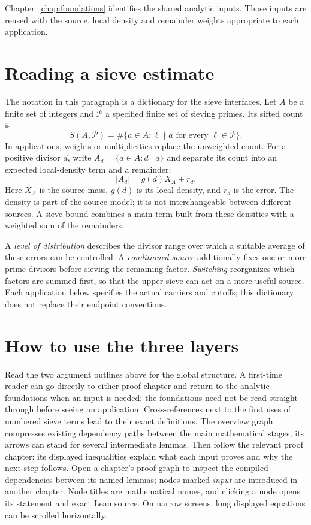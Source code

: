 Chapter~\ref{chap:foundations} identifies the shared analytic inputs.
Those inputs are reused with the source, local density and remainder
weights appropriate to each application.

\section{Reading a sieve estimate}

The notation in this paragraph is a dictionary for the sieve interfaces.
Let $A$ be a finite set of integers and $\mathcal P$ a specified finite set
of sieving primes. Its sifted count is
\[
 S(A,\mathcal P)=\#\{a\in A:\ell\nmid a\text{ for every }\ell\in\mathcal P\}.
\]
In applications, weights or multiplicities replace the unweighted count.
For a positive divisor $d$, write $A_d=\{a\in A:d\mid a\}$ and separate
its count into an expected local-density term and a remainder:
\[
 |A_d|=g(d)X_A+r_d.
\]
Here $X_A$ is the source mass, $g(d)$ is its local density, and $r_d$ is the
error. The density is part of the source model; it is not interchangeable
between different sources. A sieve bound combines a main term built from
these densities with a weighted sum of the remainders.

A \emph{level of distribution} describes the divisor range over which a
suitable average of these errors can be controlled. A \emph{conditioned
source} additionally fixes one or more prime divisors before sieving the
remaining factor. \emph{Switching} reorganizes which factors are summed
first, so that the upper sieve can act on a more useful source. Each
application below specifies the actual carriers and cutoffs; this dictionary
does not replace their endpoint conventions.

\section{How to use the three layers}

Read the two argument outlines above for the global structure. A first-time
reader can go directly to either proof chapter and return to the analytic
foundations when an input is needed; the foundations need not be read straight
through before seeing an application. Cross-references next to the first uses
of numbered sieve terms lead to their exact definitions. The overview
graph compresses existing dependency paths between the main mathematical
stages; its arrows can stand for several intermediate lemmas. Then follow
the relevant proof chapter: its displayed inequalities explain what each
input proves and why the next step follows. Open a chapter's proof graph to
inspect the compiled dependencies between its named lemmas; nodes marked
\emph{input} are introduced in another chapter. Node titles are mathematical
names, and clicking a node opens its statement and exact Lean source.
On narrow screens, long displayed equations can be scrolled horizontally.

